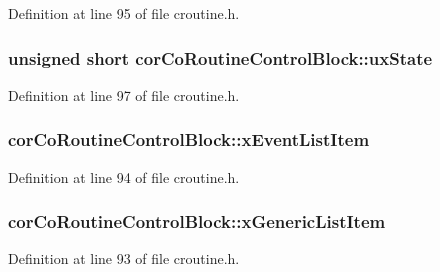 Definition at line 95 of file croutine.\-h.

\hypertarget{structcor_co_routine_control_block_adb706fe642d1c39528402ec6393fcaa9}{
\subsubsection[{ux\-State}]{\setlength{\rightskip}{0pt plus 5cm}unsigned short cor\-Co\-Routine\-Control\-Block\-::ux\-State}}\label{structcor_co_routine_control_block_adb706fe642d1c39528402ec6393fcaa9}


Definition at line 97 of file croutine.\-h.

\hypertarget{structcor_co_routine_control_block_ae3df50ba6714e9c2683cefa31dc0bc50}{
\subsubsection[{x\-Event\-List\-Item}]{ cor\-Co\-Routine\-Control\-Block\-::x\-Event\-List\-Item}}\label{structcor_co_routine_control_block_ae3df50ba6714e9c2683cefa31dc0bc50}


Definition at line 94 of file croutine.\-h.

\hypertarget{structcor_co_routine_control_block_ad088a2410ffd125ce32562e2faa4861d}{
\subsubsection[{x\-Generic\-List\-Item}]{ cor\-Co\-Routine\-Control\-Block\-::x\-Generic\-List\-Item}}\label{structcor_co_routine_control_block_ad088a2410ffd125ce32562e2faa4861d}


Definition at line 93 of file croutine.\-h.



